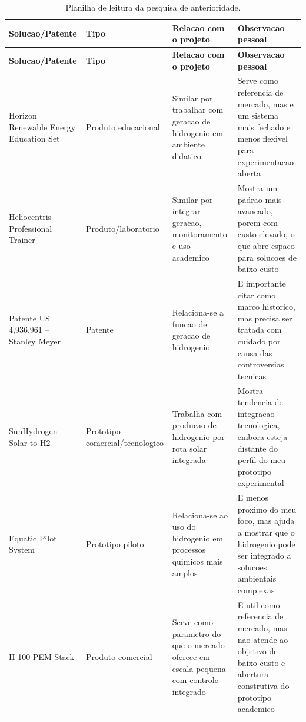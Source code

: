 \documentclass[12pt,oneside,a4paper,english,brazilian]{abntex2}
\begin{document}
\small
\setlength{\tabcolsep}{3pt}
\begin{longtable}{@{}>{\RaggedRight\arraybackslash}p{}>{\RaggedRight\arraybackslash}p{}>{\RaggedRight\arraybackslash}p{}>{\RaggedRight\arraybackslash}p{}@{}}
\caption{Planilha de leitura da pesquisa de anterioridade.}\label{tab:anterioridade}\\
\toprule
\textbf{Solucao/Patente} & \textbf{Tipo} & \textbf{Relacao com o projeto} & \textbf{Observacao pessoal} \\
\midrule
\endfirsthead

\toprule
\textbf{Solucao/Patente} & \textbf{Tipo} & \textbf{Relacao com o projeto} & \textbf{Observacao pessoal} \\
\midrule
\endhead

\midrule
\endfoot

\bottomrule
\endlastfoot

Horizon Renewable Energy Education Set & Produto educacional & Similar por trabalhar com geracao de hidrogenio em ambiente didatico & Serve como referencia de mercado, mas e um sistema mais fechado e menos flexivel para experimentacao aberta \\
\midrule
Heliocentris Professional Trainer & Produto\slash laboratorio & Similar por integrar geracao, monitoramento e uso academico & Mostra um padrao mais avancado, porem com custo elevado, o que abre espaco para solucoes de baixo custo \\
\midrule
Patente US 4,936,961 -- Stanley Meyer & Patente & Relaciona-se a funcao de geracao de hidrogenio & E importante citar como marco historico, mas precisa ser tratada com cuidado por causa das controversias tecnicas \\
\midrule
SunHydrogen Solar-to-H2 & Prototipo comercial\slash tecnologico & Trabalha com producao de hidrogenio por rota solar integrada & Mostra tendencia de integracao tecnologica, embora esteja distante do perfil do meu prototipo experimental \\
\midrule
Equatic Pilot System & Prototipo piloto & Relaciona-se ao uso do hidrogenio em processos quimicos mais amplos & E menos proximo do meu foco, mas ajuda a mostrar que o hidrogenio pode ser integrado a solucoes ambientais complexas \\
\midrule
H-100 PEM Stack & Produto comercial & Serve como parametro do que o mercado oferece em escala pequena com controle integrado & E util como referencia de mercado, mas nao atende ao objetivo de baixo custo e abertura construtiva do prototipo academico \\
\end{longtable}
\normalsize
\end{document}
